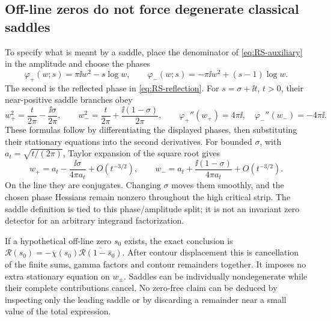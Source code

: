 \subsection{Off-line zeros do not force degenerate classical saddles}
To specify what is meant by a saddle, place the denominator of
\eqref{eq:RS-auxiliary} in the amplitude and choose the phases
\[
 \varphi_+(w;s)=\pi\ii w^2-s\log w,\qquad
 \varphi_-(w;s)=-\pi\ii w^2+(s-1)\log w.
\]
The second is the reflected phase in \eqref{eq:RS-reflection}.
For \(s=\sigma+\ii t\), \(t>0\), their near-positive saddle branches obey
\begin{equation}\label{eq:RS-saddles}
 w_+^2=\frac{t}{2\pi}-\frac{\ii\sigma}{2\pi},\qquad
 w_-^2=\frac{t}{2\pi}+\frac{\ii(1-\sigma)}{2\pi},\qquad
 \varphi_+''(w_+)=4\pi\ii,\quad \varphi_-''(w_-)=-4\pi\ii.
\end{equation}
These formulas follow by differentiating the displayed phases, then
substituting their stationary equations into the second derivatives.
For bounded \(\sigma\), with \(a_t=\sqrt{t/(2\pi)}\), Taylor expansion
of the square root gives
\[
 w_+=a_t-\frac{\ii\sigma}{4\pi a_t}+O(t^{-3/2}),\qquad
 w_-=a_t+\frac{\ii(1-\sigma)}{4\pi a_t}+O(t^{-3/2}).
\]
On the line they are conjugates. Changing \(\sigma\) moves them
smoothly, and the chosen phase Hessians remain nonzero throughout the
high critical strip. The saddle definition is tied to this phase/amplitude
split; it is not an invariant zero detector for an arbitrary integrand
factorization.

If a hypothetical off-line zero \(s_0\) exists, the exact conclusion is
\(\mathscr R(s_0)=-\chi(s_0)\overline{\mathscr R(1-\bar s_0)}\).
After contour displacement this is cancellation of the finite sums,
gamma factors and contour remainders together. It imposes no extra
stationary equation on \(w_\pm\). Saddles can be individually
nondegenerate while their complete contributions cancel. No zero-free
claim can be deduced by inspecting only the leading saddle or by
discarding a remainder near a small value of the total expression.

